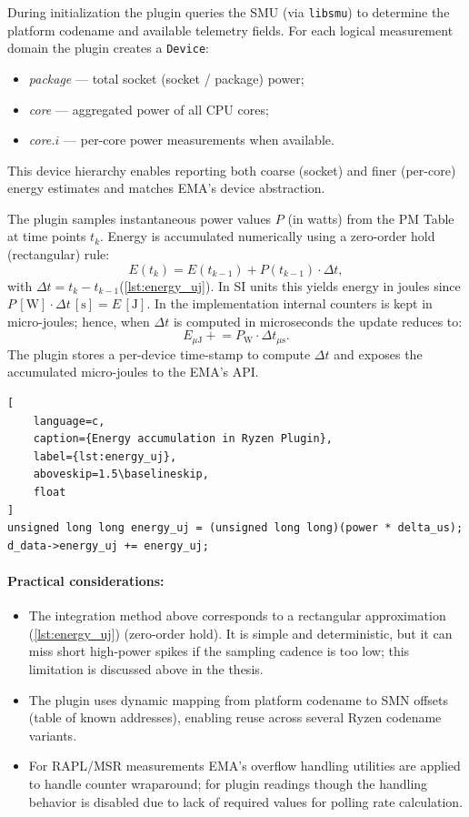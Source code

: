 During initialization the plugin queries the \gls{SMU} (via \texttt{libsmu})
to determine the platform codename and available telemetry fields. For
each logical measurement domain the plugin creates a \texttt{Device}:
\begin{itemize}
  \item \emph{package} — total socket (socket / package) power;
  \item \emph{core}  — aggregated power of all CPU cores;
  \item \emph{core.\(i\)} — per-core power measurements when available.
\end{itemize}
This device hierarchy enables reporting both coarse (socket) and finer
(per-core) energy estimates and matches \gls{EMA}'s device abstraction.

The plugin samples instantaneous power values \(P\) (in watts) from the
\gls{PM} Table at time points \(t_k\). Energy is accumulated numerically
using a zero-order hold (rectangular) rule:
\[
  E(t_k) = E(t_{k-1}) + P(t_{k-1}) \cdot \Delta t,
\]
with \(\Delta t = t_k - t_{k-1}\)(\cref{lst:energy_uj}). In SI units this
yields energy in joules since
\(P\,[\mathrm{W}]\cdot\Delta t\,[\mathrm{s}] = E\,[\mathrm{J}]\).
In the implementation internal counters is kept in micro-joules; hence,
when \(\Delta t\) is computed in microseconds the update reduces to:
\[
  E_{\mu\mathrm{J}} \mathrel{+}= P_{\mathrm{W}} \cdot \Delta t_{\mu\mathrm{s}}.
\]
The plugin stores a per-device time-stamp to compute \(\Delta t\) and
exposes the accumulated micro-joules to the \gls{EMA}'s API.

\begin{samepage}
\begin{lstlisting}[
    language=c,
    caption={Energy accumulation in Ryzen Plugin},
    label={lst:energy_uj},
    aboveskip=1.5\baselineskip,
    float
]
unsigned long long energy_uj = (unsigned long long)(power * delta_us);
d_data->energy_uj += energy_uj;
\end{lstlisting}
\end{samepage}

\paragraph{Practical considerations:}
\label{para:practical}
\begin{itemize}
  \item The integration method above corresponds to a rectangular
    approximation (\cref{lst:energy_uj}) (zero-order hold). It is simple and
    deterministic, but it can miss short high-power spikes if the sampling
    cadence is too low; this limitation is discussed above in the thesis.
  \item The plugin uses dynamic mapping from platform codename to \gls{SMN}
    offsets (table of known addresses), enabling reuse across several
    Ryzen codename variants.
  \item For \gls{RAPL}/\gls{MSR} measurements \gls{EMA}'s overflow handling
    utilities are applied to handle counter wraparound; for plugin readings 
    though the handling behavior is disabled due to lack of required values
    for polling rate calculation.
\end{itemize}


